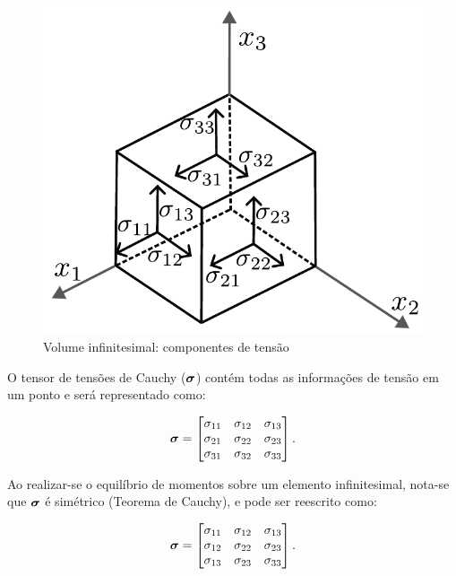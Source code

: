 \documentclass[tese_patricia]{subfiles}
\begin{document}
\begin{figure}[htb!]
	\centering
	\includegraphics[scale=0.5,trim=0cm 0.0cm 0cm 0cm, clip=true]{Imagens/Cap4/sol_vol_equi.pdf}	
	\caption{Volume infinitesimal: componentes de tensão}
	\label{fig:sol_equi}
\end{figure}

O tensor de tensões de Cauchy ($\bm{\sigma}$) contém todas as informações de tensão em um ponto e será representado como:

\begin{align}
\bm{\sigma} =
\begin{bmatrix}
	\sigma_{11} & \sigma_{12} & \sigma_{13} \\
	\sigma_{21} & \sigma_{22} & \sigma_{23} \\
	\sigma_{31} & \sigma_{32} & \sigma_{33}
\end{bmatrix}
.
\end{align}

Ao realizar-se o equilíbrio de momentos sobre um elemento infinitesimal, nota-se que $\bm{\sigma}$ é simétrico (Teorema de Cauchy), e pode ser reescrito como:

\begin{align}
	\bm{\sigma} =
	\begin{bmatrix}
		\sigma_{11} & \sigma_{12} & \sigma_{13} \\
		\sigma_{12} & \sigma_{22} & \sigma_{23} \\
		\sigma_{13} & \sigma_{23} & \sigma_{33}
	\end{bmatrix}
	.
\end{align}
\end{document}
